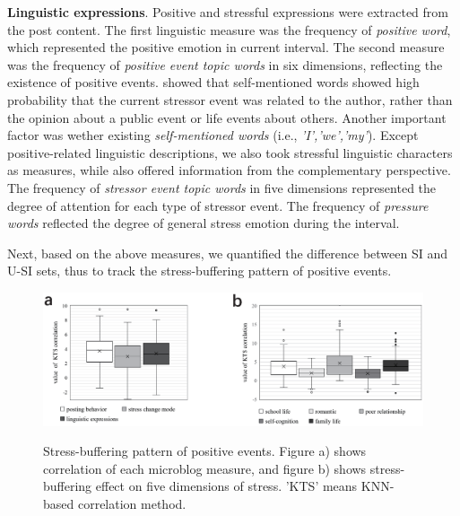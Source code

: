\textbf{Linguistic expressions}.
Positive and stressful expressions were extracted from the post content.
The first linguistic measure was the frequency of \emph{positive word},
which represented the positive emotion in current interval.
The second measure was the frequency of \emph{positive event topic words} in six dimensions,
reflecting the existence of positive events.
\citep{Li2014Major} showed that self-mentioned words showed high probability that the current stressor event was related to the author,
rather than the opinion about a public event or life events about others.
Another important factor was wether existing \emph{self-mentioned words} (i.e., \emph{'I','we','my'}).
Except positive-related linguistic descriptions, we also took stressful linguistic characters as measures,
while also offered information from the complementary perspective.
The frequency of \emph{stressor event topic words} in five dimensions represented the degree of attention for each type of stressor event.
The frequency of \emph{pressure words} reflected the degree of general stress emotion during the interval.

Next,
based on the above measures,
we quantified the difference between SI and U-SI sets, thus to track the stress-buffering pattern of positive events.

\begin{figure}
\centering
\caption{Stress-buffering pattern of positive events. Figure a) shows correlation of each microblog measure,
and figure b) shows stress-buffering effect on five dimensions of stress. 'KTS' means KNN-based correlation method.}
\includegraphics[width=0.9\linewidth]{figs/BOX.eps}%
\label{fig:correlation}
\end{figure}

